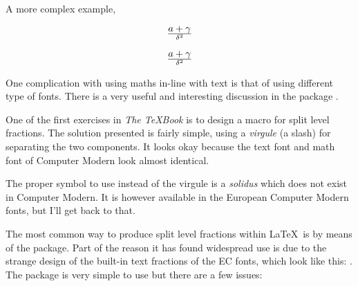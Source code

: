 A more complex example,

\begin{teX}
\[
a+\gamma \over \delta^2
\]
\end{teX}

\[a+\gamma \over \delta^2\]

One complication with using maths in-line with text is that of using different type of fonts. There is a very useful and interesting discussion in the package . 

 One of the first exercises in \emph{The \TeX Book} is to design a
 macro for split level fractions. The solution presented is fairly
  simple, using a \emph{virgule} (a slash) for separating the two
  components. It looks okay because the text font and math font of
  Computer Modern look almost identical.

  The proper symbol to use instead of the virgule is a \emph{solidus}
  which does not exist in Computer Modern. It is however available in
  the European Computer Modern fonts, but I'll get back to that.

  The most common way to produce split level fractions within \LaTeX\
  is by means of the  package. Part of the reason it
  has found widespread use is due to the strange design of the
  built-in text fractions of the EC fonts, which look like this:
  \textonehalf. The package is very simple to use but there are a few
  issues:

